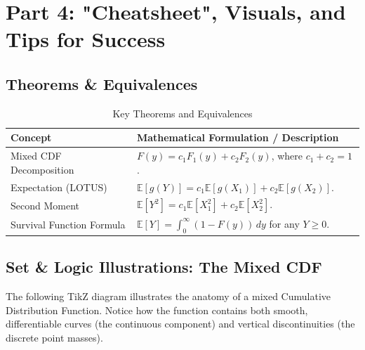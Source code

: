 \documentclass[11pt, a4paper]{article}
\theoremstyle{definition}
\theoremstyle{remark}
\newcommand{\E}{\mathbb{E}}
\begin{document}
\newpage
\section{Part 4: "Cheatsheet", Visuals, and Tips for Success}

\subsection{Theorems \& Equivalences}
\begin{table}[htbp]
\centering
\renewcommand{\arraystretch}{1.5}
\begin{tabularx}{\textwidth}{@{} l X @{}}
\toprule
\textbf{Concept} & \textbf{Mathematical Formulation / Description} \\
\midrule
Mixed CDF Decomposition & $F(y) = c_1 F_1(y) + c_2 F_2(y)$, where $c_1 + c_2 = 1$. \\
Expectation (LOTUS) & $\E[g(Y)] = c_1 \E[g(X_1)] + c_2 \E[g(X_2)]$. \\
Second Moment & $\E[Y^2] = c_1 \E[X_1^2] + c_2 \E[X_2^2]$. \\
Survival Function Formula & $\E[Y] = \int_0^\infty (1 - F(y)) \, dy$ for any $Y \ge 0$. \\
\bottomrule
\end{tabularx}
\caption{Key Theorems and Equivalences}
\end{table}

\subsection{Set \& Logic Illustrations: The Mixed CDF}
The following TikZ diagram illustrates the anatomy of a mixed Cumulative Distribution Function. Notice how the function contains both smooth, differentiable curves (the continuous component) and vertical discontinuities (the discrete point masses).
\end{document}
